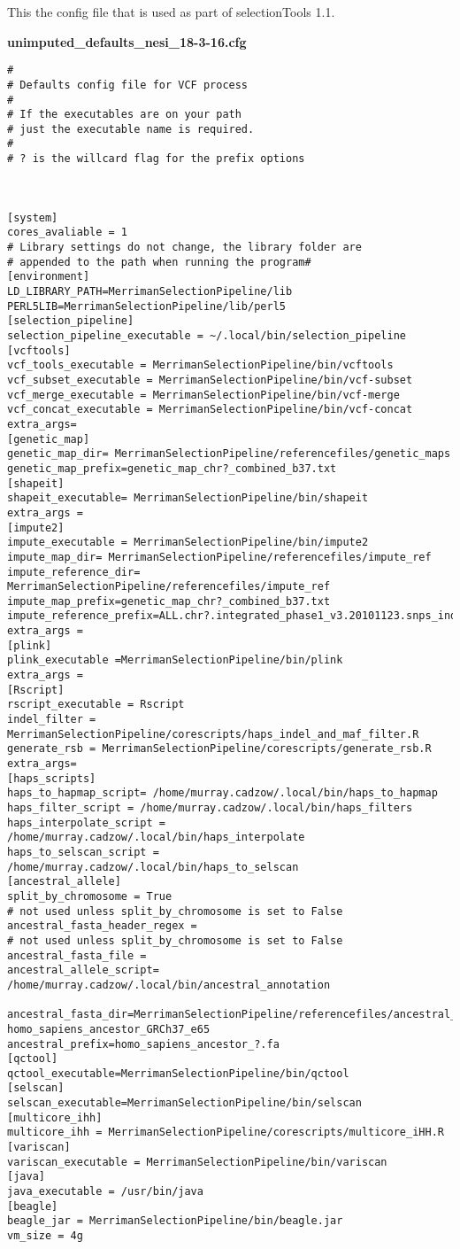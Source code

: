 \documentclass[]{report}
\begin{document}
This the config file that is used as part of selectionTools 1.1.

\textbf{unimputed\_defaults\_nesi\_18-3-16.cfg}

\begin{verbatim}
#
# Defaults config file for VCF process
#
# If the executables are on your path 
# just the executable name is required.
#
# ? is the willcard flag for the prefix options



[system]
cores_avaliable = 1
# Library settings do not change, the library folder are 
# appended to the path when running the program#
[environment]
LD_LIBRARY_PATH=MerrimanSelectionPipeline/lib
PERL5LIB=MerrimanSelectionPipeline/lib/perl5
[selection_pipeline]
selection_pipeline_executable = ~/.local/bin/selection_pipeline
[vcftools]
vcf_tools_executable = MerrimanSelectionPipeline/bin/vcftools
vcf_subset_executable = MerrimanSelectionPipeline/bin/vcf-subset
vcf_merge_executable = MerrimanSelectionPipeline/bin/vcf-merge
vcf_concat_executable = MerrimanSelectionPipeline/bin/vcf-concat
extra_args= 
[genetic_map]
genetic_map_dir= MerrimanSelectionPipeline/referencefiles/genetic_maps
genetic_map_prefix=genetic_map_chr?_combined_b37.txt
[shapeit]
shapeit_executable= MerrimanSelectionPipeline/bin/shapeit
extra_args =
[impute2]
impute_executable = MerrimanSelectionPipeline/bin/impute2
impute_map_dir= MerrimanSelectionPipeline/referencefiles/impute_ref
impute_reference_dir= MerrimanSelectionPipeline/referencefiles/impute_ref
impute_map_prefix=genetic_map_chr?_combined_b37.txt
impute_reference_prefix=ALL.chr?.integrated_phase1_v3.20101123.snps_indels_svs.genotypes.nomono
extra_args = 
[plink]
plink_executable =MerrimanSelectionPipeline/bin/plink
extra_args = 
[Rscript]
rscript_executable = Rscript
indel_filter = MerrimanSelectionPipeline/corescripts/haps_indel_and_maf_filter.R
generate_rsb = MerrimanSelectionPipeline/corescripts/generate_rsb.R
extra_args=
[haps_scripts]
haps_to_hapmap_script= /home/murray.cadzow/.local/bin/haps_to_hapmap
haps_filter_script = /home/murray.cadzow/.local/bin/haps_filters
haps_interpolate_script = /home/murray.cadzow/.local/bin/haps_interpolate
haps_to_selscan_script = /home/murray.cadzow/.local/bin/haps_to_selscan
[ancestral_allele]
split_by_chromosome = True
# not used unless split_by_chromosome is set to False
ancestral_fasta_header_regex = 
# not used unless split_by_chromosome is set to False
ancestral_fasta_file =
ancestral_allele_script= /home/murray.cadzow/.local/bin/ancestral_annotation

ancestral_fasta_dir=MerrimanSelectionPipeline/referencefiles/ancestral_ref/\
homo_sapiens_ancestor_GRCh37_e65
ancestral_prefix=homo_sapiens_ancestor_?.fa
[qctool]
qctool_executable=MerrimanSelectionPipeline/bin/qctool
[selscan]
selscan_executable=MerrimanSelectionPipeline/bin/selscan
[multicore_ihh]
multicore_ihh = MerrimanSelectionPipeline/corescripts/multicore_iHH.R
[variscan]
variscan_executable = MerrimanSelectionPipeline/bin/variscan
[java]
java_executable = /usr/bin/java
[beagle]
beagle_jar = MerrimanSelectionPipeline/bin/beagle.jar
vm_size = 4g
\end{verbatim}
\end{document}
